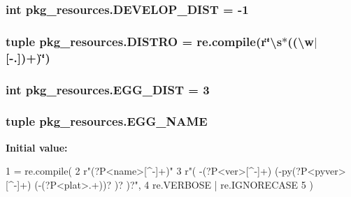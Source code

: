 \subsubsection[{D\+E\+V\+E\+L\+O\+P\+\_\+\+D\+I\+S\+T}]{\setlength{\rightskip}{0pt plus 5cm}int pkg\+\_\+resources.\+D\+E\+V\+E\+L\+O\+P\+\_\+\+D\+I\+S\+T = -\/1}\label{namespacepkg__resources_a3831b5c990f62e01f97b3a4f33a75a83}
\hypertarget{namespacepkg__resources_a33f8e662c7503913abc27fd1b4005d31}{}
\subsubsection[{D\+I\+S\+T\+R\+O}]{\setlength{\rightskip}{0pt plus 5cm}tuple pkg\+\_\+resources.\+D\+I\+S\+T\+R\+O = re.\+compile({\bf r}\char`\"{}\textbackslash{}s$\ast$((\textbackslash{}w$\vert$\mbox{[}-\/.\mbox{]})+)\char`\"{})}\label{namespacepkg__resources_a33f8e662c7503913abc27fd1b4005d31}
\hypertarget{namespacepkg__resources_a6710a7d7eb62b157b3d75a3c79b48c01}{}
\subsubsection[{E\+G\+G\+\_\+\+D\+I\+S\+T}]{\setlength{\rightskip}{0pt plus 5cm}int pkg\+\_\+resources.\+E\+G\+G\+\_\+\+D\+I\+S\+T = 3}\label{namespacepkg__resources_a6710a7d7eb62b157b3d75a3c79b48c01}
\hypertarget{namespacepkg__resources_aeabc4fefd5622d5295b6a9230c3f866d}{}
\subsubsection[{E\+G\+G\+\_\+\+N\+A\+M\+E}]{\setlength{\rightskip}{0pt plus 5cm}tuple pkg\+\_\+resources.\+E\+G\+G\+\_\+\+N\+A\+M\+E}\label{namespacepkg__resources_aeabc4fefd5622d5295b6a9230c3f866d}
{\bfseries Initial value\+:}
\begin{DoxyCode}
1 = re.compile(
2     \textcolor{stringliteral}{r"(?P<name>[^-]+)"}
3     \textcolor{stringliteral}{r"( -(?P<ver>[^-]+) (-py(?P<pyver>[^-]+) (-(?P<plat>.+))? )? )?"},
4     re.VERBOSE | re.IGNORECASE
5 )
\end{DoxyCode}
\hypertarget{namespacepkg__resources_a1f22b99f4d3fd3ba7a293a9e53351377}{}
